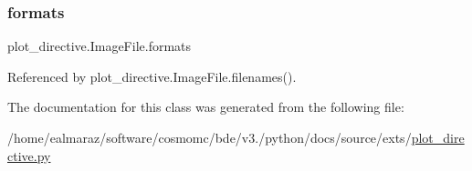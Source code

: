\mbox{\label{classplot__directive_1_1ImageFile_a0f0c93edf1d8f29aa7a62bd8bf7621b0}} 
\subsubsection{\texorpdfstring{formats}{formats}}
{\footnotesize\ttfamily plot\+\_\+directive.\+Image\+File.\+formats}



Referenced by plot\+\_\+directive.\+Image\+File.\+filenames().



The documentation for this class was generated from the following file\+:\begin{DoxyCompactItemize}
\item 
/home/ealmaraz/software/cosmomc/bde/v3./python/docs/source/exts/\mbox{\hyperlink{plot__directive_8py}{plot\+\_\+directive.\+py}}\end{DoxyCompactItemize}

